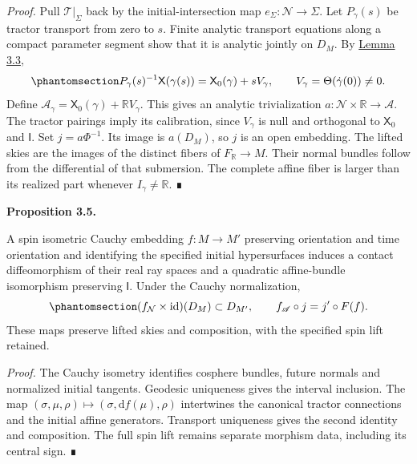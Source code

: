 \documentclass[
  english,
  11pt,
  reqno]{amsart}
\makeatletter
\newcommand{\pandocstatementheading}[1]{%
  \par\addpenalty{\@beginparpenalty}%
  \addvspace{.5\baselineskip plus .2\baselineskip minus .2\baselineskip}%
  {\normalfont\bfseries #1\par}%
  \nobreak\@afterindenttrue\@afterheading
}
\makeatother
\begin{document}
\emph{Proof.} Pull \(\mathcal T|_\Sigma\) back by the
initial-intersection map \(e_\Sigma:\mathcal N\to\Sigma\). Let
\(P_\gamma(s)\) be tractor transport from zero to \(s\). Finite analytic
transport equations along a compact parameter segment show that it is
analytic jointly on \(D_M\). By
\hyperref[lem:real-ray-affine-tractor]{Lemma 3.3},
\begin{equation}\protect\phantomsection\label{eq:global-real-affine-tractor-line}{
P_\gamma(s)^{-1}\mathsf X(\gamma(s))
=\mathsf X_0(\gamma)+sV_\gamma,
\qquad V_\gamma=\Theta(\dot\gamma(0))\ne0.
}\end{equation} Define
\(\mathscr A_\gamma=\mathsf X_0(\gamma)+\mathbb RV_\gamma\). This gives
an analytic trivialization \(a:\mathcal N\times\mathbb R\to\mathscr A\).
The tractor pairings imply its calibration, since \(V_\gamma\) is null
and orthogonal to \(\mathsf X_0\) and \(\mathsf I\). Set
\(j=a\Phi^{-1}\). Its image is \(a(D_M)\), so \(j\) is an open
embedding. The lifted skies are the images of the distinct fibers of
\(F_{\mathbb R}\to M\). Their normal bundles follow from the
differential of that submersion. The complete affine fiber is larger
than its realized part whenever \(I_\gamma\ne\mathbb R\). ∎

\pandocstatementheading{\protect{}\label{prop:global-real-ray-naturality}Proposition 3.5.}

A spin isometric Cauchy embedding \(f:M\to M'\) preserving orientation
and time orientation and identifying the specified initial hypersurfaces
induces a contact diffeomorphism of their real ray spaces and a
quadratic affine-bundle isomorphism preserving \(\mathsf I\). Under the
Cauchy normalization,
\begin{equation}\protect\phantomsection\label{eq:global-real-ray-naturality}{
(f_{\mathcal N}\times\operatorname{id})(D_M)\subset D_{M'},
\qquad f_{\mathscr A}\circ j=j'\circ F(f).
}\end{equation} These maps preserve lifted skies and composition, with
the specified spin lift retained.

\emph{Proof.} The Cauchy isometry identifies cosphere bundles, future
normals and normalized initial tangents. Geodesic uniqueness gives the
interval inclusion. The map
\((\sigma,\mu,\rho)\mapsto(\sigma,\mathrm df(\mu),\rho)\) intertwines
the canonical tractor connections and the initial affine generators.
Transport uniqueness gives the second identity and composition. The full
spin lift remains separate morphism data, including its central sign. ∎
\end{document}
